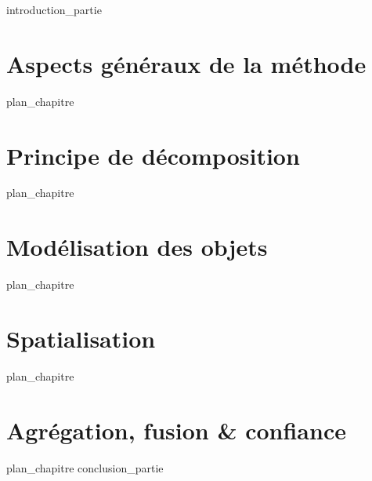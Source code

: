 \label{part:02_int}
{introduction_partie}
%
\chapter{Aspects généraux de la méthode }
\label{chap:04}
{plan_chapitre}
%
\chapter{Principe de décomposition }
\label{chap:05}
{plan_chapitre}
%
\chapter{Modélisation des objets }
\label{chap:06}
{plan_chapitre}
\chapter{Spatialisation }
\label{chap:07}
{plan_chapitre}
%
\chapter{Agrégation, fusion \& confiance }
\label{chap:08}
{plan_chapitre}
%
\label{part:02_cnc}
{conclusion_partie}
